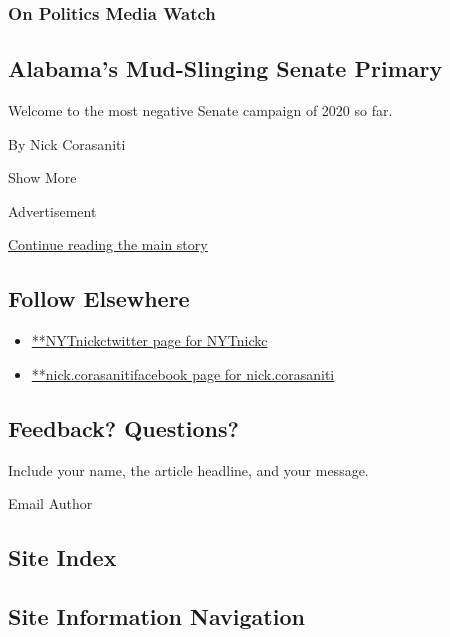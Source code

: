 \begin{enumerate}
  \hypertarget{on-politics-media-watch-3}{%
  \subsubsection{On Politics Media
  Watch}\label{on-politics-media-watch-3}}

  \hypertarget{alabamas-mud-slinging-senate-primary}{%
  \subsection{Alabama's Mud-Slinging Senate
  Primary}\label{alabamas-mud-slinging-senate-primary}}

  Welcome to the most negative Senate campaign of 2020 so far.

  By Nick Corasaniti
\end{enumerate}

Show More

Advertisement

\protect\hyperlink{after-mid2}{Continue reading the main story}

\hypertarget{follow-elsewhere}{%
\subsection{Follow Elsewhere}\label{follow-elsewhere}}

\begin{itemize}
\tightlist
\item
  \href{https://twitter.com/NYTnickc}{**NYTnickctwitter page for
  NYTnickc}
\item
  \href{https://www.facebook.com/nick.corasaniti}{**nick.corasanitifacebook
  page for nick.corasaniti}
\end{itemize}

\hypertarget{feedback-questions}{%
\subsection{Feedback? Questions?}\label{feedback-questions}}

Include your name, the article headline, and your message.

Email Author

\hypertarget{site-index}{%
\subsection{Site Index}\label{site-index}}

\hypertarget{site-information-navigation}{%
\subsection{Site Information
Navigation}\label{site-information-navigation}}

